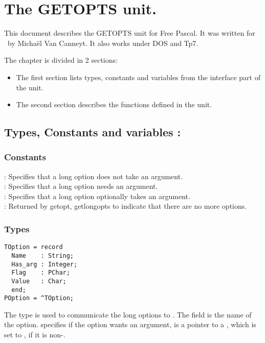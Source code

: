 %
%
%
%
%
\chapter{The GETOPTS unit.}
This document describes the GETOPTS unit for Free Pascal. It was written for
\linux\ by Micha\"el Van Canneyt. It also works under DOS and Tp7.

The chapter is divided in 2 sections:
\begin{itemize}
\item The first section lists types, constants and variables from the
interface part of the unit.
\item The second section describes the functions defined in the unit.
\end{itemize}

\section {Types, Constants and variables : }
\subsection{Constants}
 : Specifies that a long option does not take an
argument. \\
 : Specifies that a long option needs an
argument. \\
 : Specifies that a long option optionally takes an
argument. \\
  : Returned by getopt, getlongopts to indicate that
there are no more options.
\subsection{Types}
\begin{verbatim}
TOption = record
  Name    : String;
  Has_arg : Integer;
  Flag    : PChar;
  Value   : Char;
  end;
POption = ^TOption;
\end{verbatim}
The  type is used to communicate the long options to .
The  field is the name of the option.  specifies if the option
wants an argument,  is a pointer to a , which is set to
, if it is non-. 

